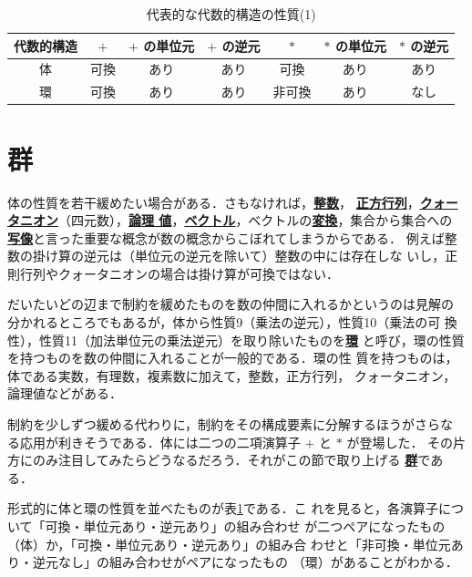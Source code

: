 \documentclass[a5paper,twoside,fleqn,draft]{jsbook}
\newcommand{\keyword}[1]{{\underline{\textbf{#1}}}}
\begin{document}
\begin{table}
\caption{代表的な代数的構造の性質(1)}
\label{tab:field-and-ring}
\begin{center}
\begin{tabular}{||c||c|c|c|c|c|c||}
\hline
代数的構造&$+$&$+$ の単位元&$+$ の逆元&$*$&$*$ の単位元&$*$ の逆元\\
\hline\hline
体&可換&あり&あり&可換&あり&あり\\
環&可換&あり&あり&非可換&あり&なし\\
\hline
\end{tabular}
\end{center}
\end{table}

\section{群}

体の性質を若干緩めたい場合がある．さもなければ，\keyword{整数}，
\keyword{正方行列}，\keyword{クォータニオン}（四元数），\keyword{論理
値}，\keyword{ベクトル}，ベクトルの\keyword{変換}，集合から集合への
\keyword{写像}と言った重要な概念が数の概念からこぼれてしまうからである．
例えば整数の掛け算の逆元は（単位元の逆元を除いて）整数の中には存在しな
いし，正則行列やクォータニオンの場合は掛け算が可換ではない．

だいたいどの辺まで制約を緩めたものを数の仲間に入れるかというのは見解の
分かれるところでもあるが，体から性質9（乗法の逆元），性質10（乗法の可
換性），性質11（加法単位元の乗法逆元）を取り除いたものを\keyword{環}
と呼び，環の性質を持つものを数の仲間に入れることが一般的である．環の性
質を持つものは，体である実数，有理数，複素数に加えて，整数，正方行列，
クォータニオン，論理値などがある．

制約を少しずつ緩める代わりに，制約をその構成要素に分解するほうがさらな
る応用が利きそうである．体には二つの二項演算子 $+$ と $*$ が登場した．
その片方にのみ注目してみたらどうなるだろう．それがこの節で取り上げる
\keyword{群}である．

形式的に体と環の性質を並べたものが表\ref{tab:field-and-ring}である．こ
れを見ると，各演算子について「可換・単位元あり・逆元あり」の組み合わせ
が二つペアになったもの（体）か，「可換・単位元あり・逆元あり」の組み合
わせと「非可換・単位元あり・逆元なし」の組み合わせがペアになったもの
（環）があることがわかる．
\end{document}
